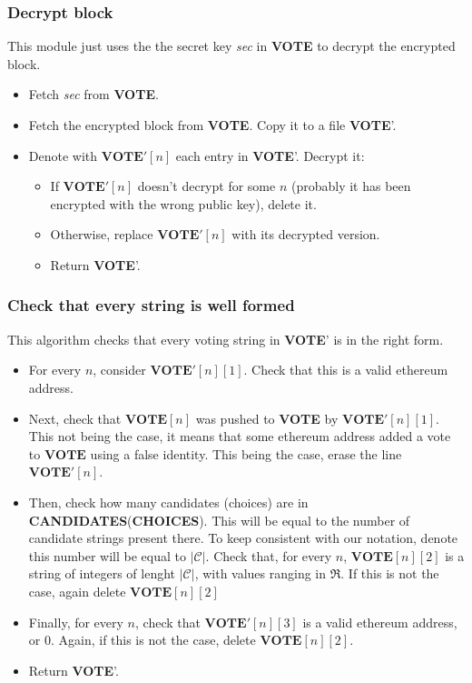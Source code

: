 \documentclass[submission, copyright,creativecommons,sharealike,noncommercial]{eptcs}
\newcommand{\candidates}{\ensuremath{\mathcal{C}} \xspace}
\newcommand{\range}{\ensuremath{\mathfrak{R}}\xspace}
\newcommand{\Candidates}{\textbf{CANDIDATES}\xspace}
\newcommand{\Choices}{\textbf{CHOICES}\xspace}
\newcommand{\Vote}{\textbf{VOTE}\xspace}
\begin{document}
\subsubsection{Decrypt block}\label{subsubsec:Decrypt block}
This module just uses the the secret key \emph{sec} in \Vote to decrypt the encrypted block.
	\begin{itemize}
		\item Fetch \emph{sec} from \Vote.
		\item Fetch the encrypted block from \Vote. Copy it to a file \Vote'.
		\item Denote with $\Vote'[n]$ each entry in \Vote'. Decrypt it:
		\begin{itemize}
			\item If $\Vote'[n]$ doesn't decrypt for some $n$ (probably it has been encrypted with the wrong public key), delete it.
			\item Otherwise, replace $\Vote'[n]$ with its decrypted version.
			\item Return \Vote'.
		\end{itemize}
	\end{itemize}


\subsubsection{Check that every string is well formed}\label{subsubsec:Check that every string is well formed}
	This algorithm checks that every voting string in \Vote' is in the right form.
	\begin{itemize}
		\item For every $n$, consider $\Vote'[n][1]$. Check that this is a valid ethereum address.
		
		\item Next, check that $\Vote[n]$ was pushed to \Vote by $\Vote'[n][1]$. This not being the case, it means that some ethereum address added a vote to $\Vote$ using a false identity. This being the case, erase the line $\Vote'[n]$. 
		
		\item Then, check how many candidates (choices) are in \Candidates (\Choices). This will be equal to the number of candidate strings present there. To keep consistent with our notation, denote this number will be equal to $|\candidates|$. Check that, for every $n$, $\Vote[n][2]$ is a string of integers of lenght $|\candidates|$, with values ranging in $\range$. If this is not the case, again delete $\Vote[n][2]$
		
		\item Finally, for every $n$, check that $\Vote'[n][3]$ is a valid ethereum address, or $0$. Again, if this is not the case, delete $\Vote[n][2]$.
		
		\item Return \Vote'.
	\end{itemize}
	
\end{document}
